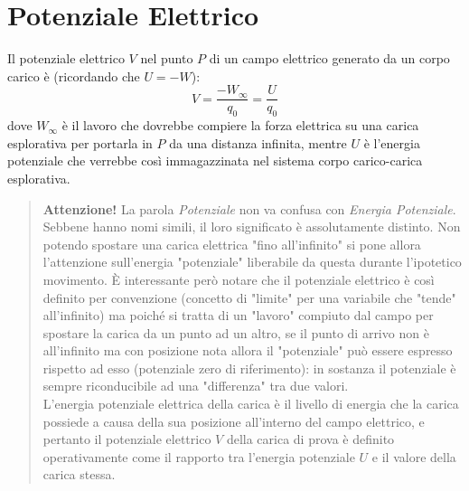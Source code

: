         \section{Potenziale Elettrico} Il potenziale elettrico $V$ nel punto 
        $P$ di un campo elettrico generato da un corpo carico è (ricordando che
        $U = -W$):
            \begin{equation}
                V = \frac{-W_\infty}{q_0} = \frac{U}{q_0}
            \end{equation}
        dove $W_\infty$ è il lavoro che dovrebbe compiere la forza elettrica su
        una carica esplorativa per portarla in $P$ da una distanza infinita, 
        mentre $U$ è l'energia potenziale che verrebbe così immagazzinata nel
        sistema corpo carico-carica esplorativa.
            \begin{quote}
                \textbf{Attenzione!} La parola \textit{Potenziale} non va 
                confusa con \textit{Energia Potenziale}. Sebbene hanno nomi 
                simili, il loro significato è assolutamente distinto.
                Non potendo spostare una carica elettrica "fino all'infinito" 
                si pone allora l'attenzione sull'energia "potenziale" 
                liberabile da questa durante l'ipotetico movimento. È 
                interessante però notare che il potenziale elettrico è così 
                definito per convenzione (concetto di "limite" per una 
                variabile che "tende" all'infinito) ma poiché si tratta di un 
                "lavoro" compiuto dal campo per spostare la carica da un punto 
                ad un altro, se il punto di arrivo non è all'infinito ma con 
                posizione nota allora il "potenziale" può essere espresso 
                rispetto ad esso (potenziale zero di riferimento): in sostanza 
                il potenziale è sempre riconducibile ad una "differenza" tra 
                due valori.\\
                L'energia potenziale elettrica della carica è il livello di 
                energia che la carica possiede a causa della sua posizione 
                all'interno del campo elettrico, e pertanto il potenziale 
                elettrico $V$ della carica di prova è definito operativamente 
                come il rapporto tra l'energia potenziale $U$ e il valore della
                carica stessa.
            \end{quote}

